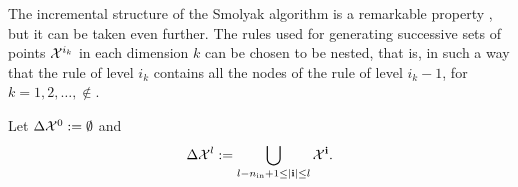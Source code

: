 The incremental structure of the Smolyak algorithm is a remarkable property
\perse, but it can be taken even further. The rules used for generating
successive sets of points $\mathcal{X}^{i_k}$ in each dimension $k$ can be chosen to be
nested, that is, in such a way that the rule of level $i_k$ contains all the
nodes of the rule of level $i_k - 1$, for $k = 1, 2, \dots, \nin$.

Let $\Delta \mathcal{X}^0 := \emptyset$ and
\[
  \Delta \mathcal{X}^l := \bigcup_{l - {n_\text{in}} + 1 \leq |\mathbf{i}| \leq l} \mathcal{X}^{\mathbf{i}}.
\]


